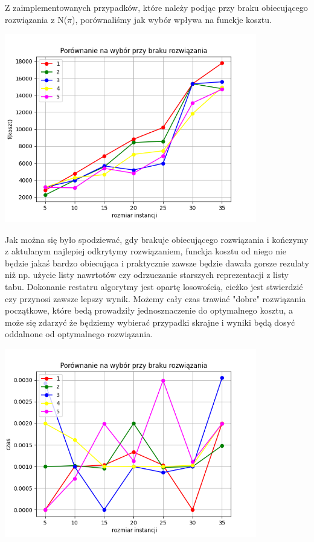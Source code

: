 \documentclass{article}
\begin{document}
    Z zaimplementowanych przypadków, które należy podjąc przy braku obiecującego
    rozwiązania z N($\pi$), porównaliśmy jak wybór wpływa na funckje kosztu.

    \includegraphics[width=11cm]{./spr2img/Figure_9.png}

    Jak można się było spodziewać, gdy brakuje obiecującego rozwiązania 
    i kończymy z aktulanym najlepiej odkrytymy rozwiązaniem, funckja kosztu
    od niego nie będzie jakaś bardzo obiecująca i praktycznie zawsze będzie
    dawała gorsze rezulaty niż np. użycie listy nawrtotów czy odrzuczanie
    starszych reprezentacji z listy tabu. Dokonanie restatru algorytmy jest
    opartę losowością, cieżko jest stwierdzić czy przynosi zawsze lepszy wynik.
    Możemy cały czas trawiać "dobre" rozwiązania początkowe, które bedą prowadziły
    jednosznaczenie do optymalnego kosztu, a może się zdarzyć że będziemy 
    wybierać przypadki skrajne i wyniki będą dosyć oddalnone od optymalnego 
    rozwiązania.

    \includegraphics[width=11cm]{./spr2img/Figure_7.png}
\end{document}
